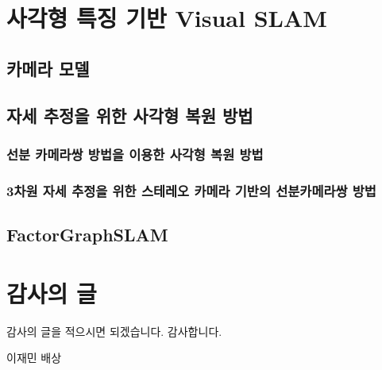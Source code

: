 \documentclass[master,korean,final]{cbnu-ecs}
\begin{document}
\chapter{사각형 특징 기반 Visual SLAM}
\section{카메라 모델}
\section{}
\section{자세 추정을 위한 사각형 복원 방법}
\cite{Guerrero2008}%
\cite{Nister2005}%

\cite{Lee2012,Lee2013}
\cite{Lee2014}
\subsection{선분 카메라쌍 방법을 이용한 사각형 복원 방법}
\subsection{3차원 자세 추정을 위한 스테레오 카메라 기반의 선분카메라쌍 방법}
\section{FactorGraphSLAM}
\cite{Dellaert2006}%
\cite{Kaess2007}
\cite{Kaess2011}



%
%
%


\chapter*{감사의 글}

감사의 글을 적으시면 되겠습니다.
감사합니다.

\begin{flushright}
\vspace{1cm}
이재민 배상
\end{flushright}
\end{document}
